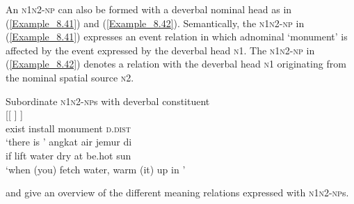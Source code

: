 An \textsc{n1n2-np} can also be formed with a deverbal nominal head as in (\ref{Example_8.41}) and (\ref{Example_8.42}). Semantically, the \textsc{n1n2-np} in (\ref{Example_8.41}) expresses an event relation in which adnominal  ‘monument’ is affected by the event expressed by the deverbal head \textsc{n1}. The \textsc{n1n2-np} in (\ref{Example_8.42}) denotes a  relation with the deverbal head \textsc{n1} originating from the nominal spatial source \textsc{n2}.


\ea 
Subordinate \textsc{n1n2-np}s with deverbal constituent \\
\ea
\label{Example_8.41}
 {[[} {]} {]}\\ %
 exist  install  monument  \textsc{d.dist}\\
 ‘there is ’ \textstyleExampleSource{[080917-008-NP.0017]}
\vspace{5pt}
\ex
\label{Example_8.42}
 {angkat} {air} {jemur} {di} {} {}\\ %
 if  lift  water  dry  at  be.hot  sun\\
\glt 
‘when (you) fetch water, warm (it) up in ’ \textstyleExampleSource{[081006-013-Cv.0005]}
\z
\z


 and    give an overview of the different  meaning relations expressed with \textsc{n1n2-np}s.


